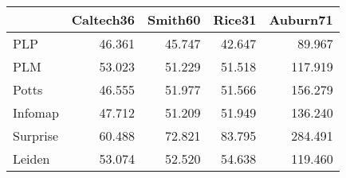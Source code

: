 \begin{tabular}{lrrrr}
\toprule
{} & Caltech36 & Smith60 & Rice31 & Auburn71 \\
\midrule
PLP      &    46.361 &  45.747 & 42.647 &   89.967 \\
PLM      &    53.023 &  51.229 & 51.518 &  117.919 \\
Potts    &    46.555 &  51.977 & 51.566 &  156.279 \\
Infomap  &    47.712 &  51.209 & 51.949 &  136.240 \\
Surprise &    60.488 &  72.821 & 83.795 &  284.491 \\
Leiden   &    53.074 &  52.520 & 54.638 &  119.460 \\
\bottomrule
\end{tabular}
